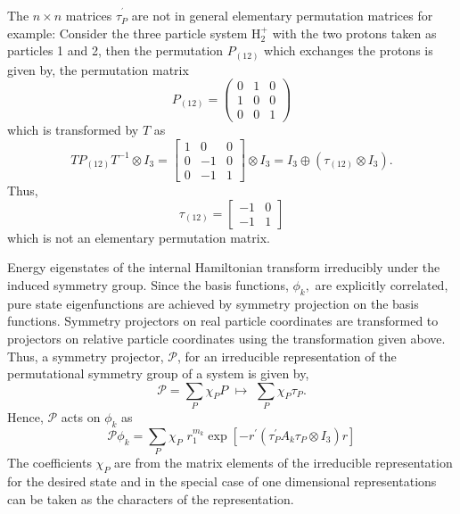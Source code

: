 \documentclass[12pt,doublespace]{article}
\begin{document}
The $n\times n$ matrices $\tau _{P}^{^{\prime }}$ are not in general
elementary permutation matrices for example: Consider the three particle
system H$_{2}^{+}$ with the two protons taken as particles 1 and 2, then the
permutation $P_{(12)}$ which exchanges the protons is given by, the
permutation matrix 
\begin{equation}
P_{(12)}=\left( 
\begin{array}{ccc}
0 & 1 & 0 \\ 
1 & 0 & 0 \\ 
0 & 0 & 1
\end{array}
\right)
\end{equation}
which is transformed by $T$ as 
\begin{equation}
TP_{\left( 12\right) }T^{-1}\otimes I_{3}=\left[ 
\begin{array}{ccc}
1 & 0 & 0 \\ 
0 & -1 & 0 \\ 
0 & -1 & 1
\end{array}
\right] \otimes I_{3}=I_{3}\oplus \left( \tau _{\left( 12\right) }\otimes
I_{3}\right) .
\end{equation}
Thus, 
\begin{equation}
\tau _{\left( 12\right) }=\left[ 
\begin{array}{cc}
-1 & 0 \\ 
-1 & 1
\end{array}
\right]
\end{equation}
which is not an elementary permutation matrix.

Energy eigenstates of the internal Hamiltonian transform irreducibly under
the induced symmetry group. Since the basis functions, $\phi _{k},$ are
explicitly correlated, pure state eigenfunctions are achieved by symmetry
projection on the basis functions. Symmetry projectors on real particle
coordinates are transformed to projectors on relative particle coordinates
using the transformation given above. Thus, a symmetry projector, $\mathcal{P%
}$, for an irreducible representation of the permutational symmetry group of
a system is given by, 
\begin{equation}
\mathcal{P}=\sum_{P}\chi _{P}P\,\,\mapsto \,\,\sum_{P}\chi _{P}\tau _{P}.
\end{equation}
Hence, $\mathcal{P}$ acts on $\phi _{k}$ as 
\begin{equation}
\mathcal{P}\phi _{k}=\sum_{P}\chi _{P}\,\,r_{1}^{m_{k}}\exp \left[
-r^{\prime }\left( \tau _{P}^{\prime }A_{k}\tau _{P}\otimes I_{3}\right) r%
\right]
\end{equation}
The coefficients $\chi _{P}$ are from the matrix elements of the irreducible
representation for the desired state and in the special case of one
dimensional representations can be taken as the characters of the
representation.
\end{document}
